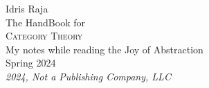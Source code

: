 \begin{titlepage}
  \raggedleft
  {\Large Idris Raja\\[1in]}
  {\large The HandBook for\\}
  {\Huge\scshape Category Theory\\[.2in]}
  {\large My notes while reading the Joy of Abstraction \cite{cheng2023}
  \\}
  {\large Spring 2024\\}
  \vfill
    {\itshape 2024, Not a Publishing Company, LLC}
\end{titlepage}

